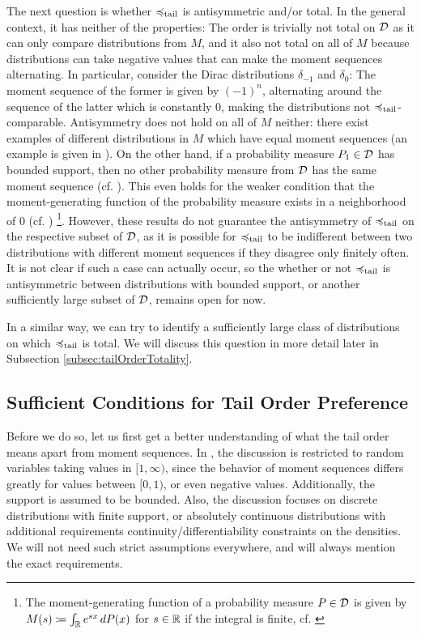 \documentclass[a4paper]{scrreprt}
\newcommand{\M}{M}
\theoremstyle{definition}
\begin{document}
    The next question is whether $\preccurlyeq_{\text{tail}}$ is antisymmetric and/or total.
    In the general context, it has neither of the properties: The order is trivially not total on $\mathcal{D}$ as it can only compare distributions from $M$, and it also not total on all of $M$ because distributions can take negative values that can make the moment sequences alternating. In particular, consider the Dirac distributions $\delta_{-1}$ and $\delta_{0}$: The moment sequence of the former is given by $(-1)^n$, alternating around the sequence of the latter which is constantly $0$, making the distributions not $\preccurlyeq_{\text{tail}}$-comparable.
    Antisymmetry does not hold on all of $M$ neither: there exist examples of different distributions in $\M$ which have equal moment sequences (an example is given in \cite[Example 3.15]{bib:romanoCounterexamplesInProbability}).
    On the other hand, if a probability measure $P_1 \in \mathcal{D}$ has bounded support, then no other probability measure from $\mathcal{D}$ has the same moment sequence (cf. \cite[Corollary 4.2]{bib:schmuedgenTheMomentProblem}).
    This even holds for the weaker condition that the moment-generating function of the probability measure exists in a neighborhood of 0 (cf. \cites[Lemma 2.3]{bib:rassGameRiskManagI}[p.414]{bib:billingsleyProbabilityAndMeasure})
     \footnote{The moment-generating function of a probability measure $P \in \mathcal{D}$ is given by $M(s) \coloneqq \int_{\mathbb{R}} e^{sx} \, dP(x)$ for $s \in \mathbb{R}$ if the integral is finite, cf. \cite[(21.21)]{bib:billingsleyProbabilityAndMeasure}}.
    However, these results do not guarantee the antisymmetry of $\preccurlyeq_{\text{tail}}$ on the respective subset of $\mathcal{D}$, as it is possible for $\preccurlyeq_{\text{tail}}$ to be indifferent between two distributions with different moment sequences if they disagree only finitely often. It is not clear if such a case can actually occur, so the whether or not $\preccurlyeq_{\text{tail}}$ is antisymmetric between distributions with bounded support, or another sufficiently large subset of $\mathcal{D}$, remains open for now.
    
    In a similar way, we can try to identify a sufficiently large class of distributions on which $\preccurlyeq_{\text{tail}}$ is total. We will discuss this question in more detail later in Subsection \ref{subsec:tailOrderTotality}.
    
    \subsection{Sufficient Conditions for Tail Order Preference}
    Before we do so, let us first get a better understanding of what the tail order means apart from moment sequences.
    In \cite{bib:rassGameRiskManagI}, the discussion is restricted to random variables taking values in $[1, \infty)$, since the behavior of moment sequences differs greatly for values between $[0, 1)$, or even negative values. Additionally, the support is assumed to be bounded. Also, the discussion focuses on discrete distributions with finite support, or absolutely continuous distributions with additional requirements continuity/differentiability constraints on the densities.
    We will not need such strict assumptions everywhere, and will always mention the exact requirements.
    
\end{document}
